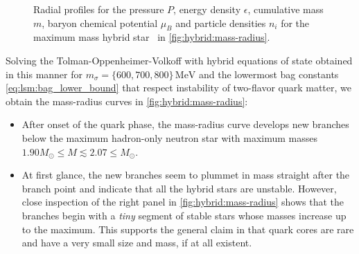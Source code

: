 \begin{figure}
\caption{\label{fig:hybrid:star}%
	Radial profiles for the
	pressure $P$,
	energy density $\epsilon$,
	cumulative mass $m$,
	baryon chemical potential $\mu_B$
	and particle densities $n_i$
	for the maximum mass hybrid star \goldenstar in \cref{fig:hybrid:mass-radius}.
}

\end{figure}

Solving the Tolman-Oppenheimer-Volkoff with hybrid equations of state obtained in this manner
for $m_\sigma=\{600,700,800\} \, \si{\mega\electronvolt}$ and the lowermost bag constants \eqref{eq:lsm:bag_lower_bound} that respect instability of two-flavor quark matter,
we obtain the mass-radius curves in \cref{fig:hybrid:mass-radius}:
\begin{itemize}
\item After onset of the quark phase, the mass-radius curve develops new branches below the maximum hadron-only neutron star
      with maximum masses $1.90 M_\odot \leq M \lesssim 2.07 \leq M_\odot$.
\item At first glance, the new branches seem to plummet in mass straight after the branch point and indicate that all the hybrid stars are unstable.
      However, close inspection of the right panel in \cref{fig:hybrid:mass-radius} shows that the branches begin with a \emph{tiny} segment of stable stars whose masses increase up to the maximum.
      This supports the general claim in \cite{ref:quark_star_review} that quark cores are rare and have a very small size and mass, if at all existent.
\end{itemize}

